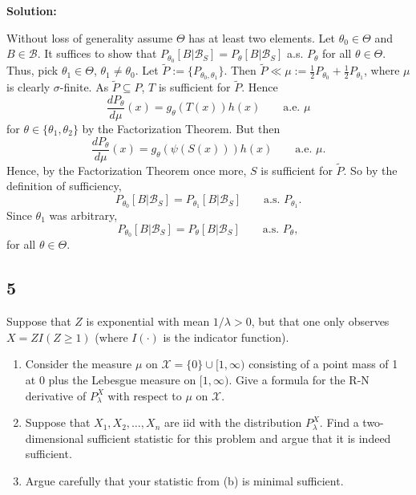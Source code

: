 \documentclass[12pt]{article}
\begin{document}
{\bf Solution:}

Without loss of generality assume $\Theta$ has at least two elements. 
Let $\theta_{0} \in \Theta$ and $B \in \mathcal{B}$. It suffices to show that $P_{\theta_{0}}[B | \mathcal{B}_{S}] = P_{\theta}[B | \mathcal{B}_{S}]$
a.s. $P_{\theta}$ for all $\theta \in \Theta$. Thus, pick $\theta_1 \in \Theta$, $\theta_1 \neq \theta_0$. Let $\tilde{P} := \{P_{\theta_0, \theta_1}\}$.
Then $\tilde{P} \ll \mu := \frac{1}{2}P_{\theta_0} + \frac{1}{2}P_{\theta_1}$, where $\mu$ is clearly $\sigma$-finite.
As $\tilde{P} \subseteq P$, $T$ is sufficient for $\tilde{P}$. Hence
\[
  \frac{dP_{\theta}}{d\mu}(x) = g_{\theta}(T(x))h(x) \qquad \text{a.e. } \mu
\]
for $\theta \in \{\theta_{1}, \theta_2\}$ by the Factorization Theorem. But then
\[
  \frac{dP_{\theta}}{d\mu}(x) = g_{\theta}(\psi(S(x)))h(x) \qquad \text{a.e. } \mu.
\]
Hence, by the Factorization Theorem once more, $S$ is sufficient for $\tilde{P}$. So by the definition of sufficiency,
\[ P_{\theta_0}[B|\mathcal{B}_{S}] = P_{\theta_1}[B|\mathcal{B}_{S}] \qquad \text{a.s. } P_{\theta_{1}}. \]
Since $\theta_{1}$ was arbitrary,
\[ P_{\theta_{0}}[B | \mathcal{B}_{S}] = P_{\theta}[B | \mathcal{B}_{S}] \qquad \text{a.s. } P_{\theta},\]
for all $\theta \in \Theta$.



\newpage
\subsection*{5}
\begin{tcolorbox}
  Suppose that $Z$ is exponential with mean $1/\lambda>0$, but that one only observes $X = Z I(Z \geq 1)$ (where $I(\cdot)$ is the indicator function).
  \begin{enumerate}
    \item Consider the measure $\mu$ on $\mathcal{X} = \{0\}\cup [1,\infty)$ consisting of a point mass of 1 at 0 plus the Lebesgue measure on $[1,\infty)$.  Give a formula for the R-N derivative of $P_\lambda^X$ with respect to $\mu$ on $\mathcal{X}$.
    \item Suppose that $X_1,X_2,\ldots,X_n$ are iid with the distribution $P_\lambda^X$.  Find a two-dimensional sufficient statistic for this problem and argue that it is indeed sufficient.
    \item Argue carefully that your statistic from (b) is minimal sufficient.
  \end{enumerate}
\end{tcolorbox}
\end{document}
